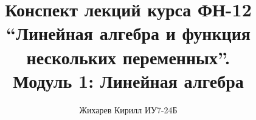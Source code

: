 \documentclass[a4paper]{article}
\title{Конспект лекций курса ФН-12 \\ ``Линейная алгебра и функция нескольких переменных''. \\ Модуль 1: Линейная алгебра}
\author{Жихарев Кирилл ИУ7-24Б}
\date{ }
\begin{document}
  \maketitle
  \pagebreak

  \tableofcontents
  \pagebreak

  
  
\end{document}

